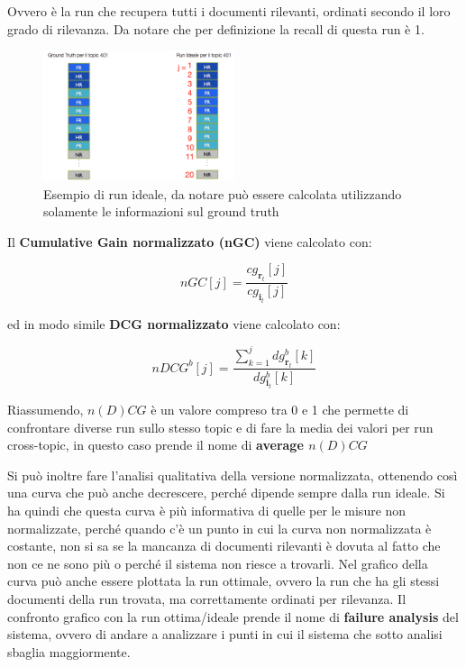 Ovvero è la run che recupera tutti i documenti rilevanti, ordinati secondo il loro grado di rilevanza. Da notare che per definizione la recall di questa run è 1.

\begin{figure}[htbp]
	\centering
	\includegraphics[width=0.5\textwidth]{images/l16-fig-7.png}
	\caption{Esempio di run ideale, da notare può essere calcolata utilizzando solamente le informazioni sul ground truth}
\end{figure}

Il \textbf{Cumulative Gain normalizzato (nGC)} viene calcolato con:

$$
nGC[j] = \frac{cg_{\mathbf{r}_t}[j]}{cg_{\mathbf{i}_t}[j]}
$$

ed in modo simile \textbf{DCG normalizzato} viene calcolato con:

$$
nDCG^b[j] = \frac{\sum_{k=1}^j dg_{\mathbf{r}_t}^b[k]}{dg_{\mathbf{i}_t}^b[k]}
$$

Riassumendo, $n(D)CG$ è un valore compreso tra 0 e 1 che permette di confrontare diverse run sullo stesso topic e di fare la media dei valori per run cross-topic, in questo caso prende il nome di \textbf{average $n(D)CG$}

Si può inoltre fare l'analisi qualitativa della versione normalizzata, ottenendo così una curva che può anche decrescere, perché dipende sempre dalla run ideale. Si ha quindi che questa curva è più informativa di quelle per le misure non normalizzate, perché quando c'è un punto in cui la curva non normalizzata è costante, non si sa se la mancanza di documenti rilevanti è dovuta al fatto che non ce ne sono più o perché il sistema non riesce a trovarli.
Nel grafico della curva può anche essere plottata la run ottimale, ovvero la run che ha gli stessi documenti della run trovata, ma correttamente ordinati per rilevanza. 
Il confronto grafico con la run ottima/ideale prende il nome di \textbf{failure analysis} del sistema, ovvero di andare a analizzare i punti in cui il sistema che sotto analisi sbaglia maggiormente.


